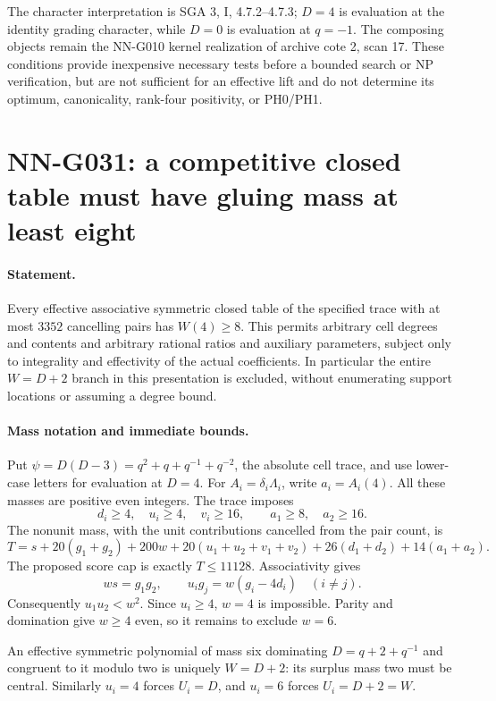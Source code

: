 The character interpretation is SGA 3, I, 4.7.2--4.7.3;
$D=4$ is evaluation at the identity grading character,
while $D=0$ is evaluation at $q=-1$.
The composing objects remain the NN-G010 kernel
realization of archive cote 2, scan 17. These conditions
provide inexpensive necessary tests before a bounded
search or NP verification, but are not sufficient for
an effective lift and do not determine its optimum,
canonicality, rank-four positivity, or PH0/PH1.



\section{NN-G031: a competitive closed table must have gluing mass at least eight}
\paragraph{Statement.}
Every effective associative symmetric closed table of the specified trace
with at most $3352$ cancelling pairs has $W(4)\ge8$.
This permits arbitrary cell degrees and contents and arbitrary
rational ratios and auxiliary parameters, subject only to
integrality and effectivity of the actual coefficients.
In particular the entire $W=D+2$ branch in this presentation is excluded, without
enumerating support locations or assuming a degree bound.

\paragraph{Mass notation and immediate bounds.}
Put $\psi=D(D-3)=q^2+q+q^{-1}+q^{-2}$, the absolute
cell trace, and use lower-case letters for evaluation at $D=4$.
For $A_i=\delta_i\Lambda_i$, write $a_i=A_i(4)$.
All these masses are positive even integers. The trace imposes
\[
 d_i\ge4,\quad u_i\ge4,\quad v_i\ge16,\qquad
 a_1\ge8,\quad a_2\ge16.
\]
The nonunit mass, with the unit contributions cancelled from
the pair count, is
\[
 T=s+20(g_1+g_2)+200w+20(u_1+u_2+v_1+v_2)
       +26(d_1+d_2)+14(a_1+a_2).                    \tag{G031.1}
\]
The proposed score cap is exactly $T\le11128$.
Associativity gives
\[
 ws=g_1g_2,\qquad u_i g_j=w(g_i-4d_i)\quad(i\ne j).
                                                               \tag{G031.2}
\]
Consequently $u_1u_2<w^2$. Since $u_i\ge4$, $w=4$
is impossible. Parity and domination give $w\ge4$ even,
so it remains to exclude $w=6$.

An effective symmetric polynomial of mass six dominating
$D=q+2+q^{-1}$ and congruent to it modulo two is uniquely
$W=D+2$: its surplus mass two must be central.
Similarly $u_i=4$ forces $U_i=D$, and $u_i=6$ forces
$U_i=D+2=W$.

